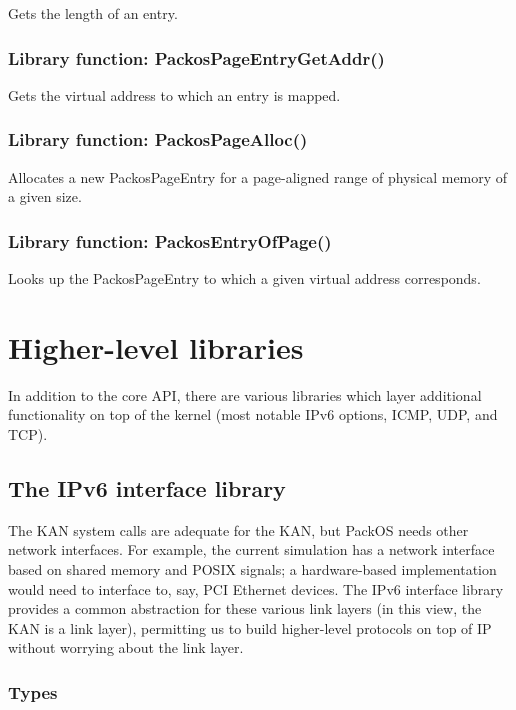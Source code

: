 \documentclass{article}
\begin{document}
Gets the length of an entry.

\subsubsection{Library function: PackosPageEntryGetAddr()}

Gets the virtual address to which an entry is mapped.

\subsubsection{Library function: PackosPageAlloc()}

Allocates a new PackosPageEntry for a page-aligned range of physical
memory of a given size.

\subsubsection{Library function: PackosEntryOfPage()}

Looks up the PackosPageEntry to which a given virtual address
corresponds.

\section{Higher-level libraries}

In addition to the core API, there are various libraries which layer
additional functionality on top of the kernel (most notable IPv6
options, ICMP, UDP, and TCP).

\subsection{The IPv6 interface library}

The KAN system calls are adequate for the KAN, but PackOS needs other
network interfaces.  For example, the current simulation has a network
interface based on shared memory and POSIX signals; a hardware-based
implementation would need to interface to, say, PCI Ethernet devices.
The IPv6 interface library provides a common abstraction for these
various link layers (in this view, the KAN is a link layer),
permitting us to build higher-level protocols on top of IP without
worrying about the link layer.

\subsubsection{Types}
\end{document}
